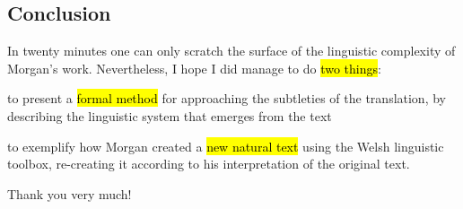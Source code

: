 \begin{paper}
	\section{Conclusion}

	In twenty minutes one can only scratch the surface of the linguistic complexity of Morgan’s work. Nevertheless, I hope I did manage to do \hl{two things}:
	\begin{compactitem}
		\item to present a \hl{formal method} for approaching the subtleties of the translation, by describing the linguistic system that emerges from the text
		\item to exemplify how Morgan created a \hl{new natural text} using the Welsh linguistic toolbox, re-creating it according to his interpretation of the original text.
	\end{compactitem}

	Thank you very much!
\end{paper}

